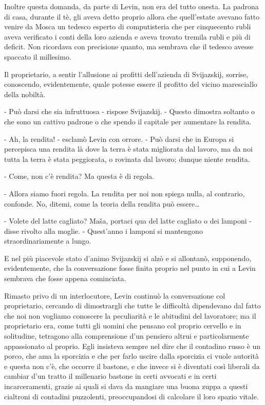 Inoltre questa domanda, da parte di Levin, non era del tutto onesta. La padrona di casa, durante il tè, gli aveva detto proprio allora che quell'estate avevano fatto venire da Mosca un tedesco esperto di computisteria che per cinquecento rubli aveva verificato i conti della loro azienda e aveva trovato tremila rubli e più di deficit. Non ricordava con precisione quanto, ma sembrava che il tedesco avesse spaccato il millesimo. 

Il proprietario, a sentir l'allusione ai profitti dell'azienda di Svijazskij, sorrise, conoscendo, evidentemente, quale potesse essere il profitto del vicino maresciallo della nobiltà. 

- Può darsi che sia infruttuosa - rispose Svijazskij. - Questo dimostra soltanto o che sono un cattivo padrone o che spendo il capitale per aumentare la rendita. 

- Ah, la rendita! - esclamò Levin con orrore. - Può darsi che in Europa si percepisca una rendita là dove la terra è stata migliorata dal lavoro, ma da noi tutta la terra è stata peggiorata, o rovinata dal lavoro; dunque niente rendita. 

- Come, non c'è rendita? Ma questa è di regola. 

- Allora siamo fuori regola. La rendita per noi non spiega nulla, al contrario, confonde. No, ditemi, come la teoria della rendita può essere\ldots{} 
\enlargethispage*{1\baselineskip}

- Volete del latte cagliato? Maša, portaci qua del latte cagliato o dei lamponi - disse rivolto alla moglie. - Quest'anno i lamponi si mantengono straordinariamente a lungo. 

E nel più piacevole stato d'animo Svijazskij si alzò e si allontanò, supponendo, evidentemente, che la conversazione fosse finita proprio nel punto in cui a Levin sembrava che fosse appena cominciata. 

Rimasto privo di un interlocutore, Levin continuò la conversazione col proprietario, cercando di dimostrargli che tutte le difficoltà dipendevano dal fatto che noi non vogliamo conoscere la peculiarità e le abitudini del lavoratore; ma il proprietario era, come tutti gli uomini che pensano col proprio cervello e in solitudine, tetragono alla comprensione d'un pensiero altrui e particolarmente appassionato al proprio. Egli insisteva sempre nel dire che il contadino russo è un porco, che ama la sporcizia e che per farlo uscire dalla sporcizia ci vuole autorità e questa non c'è, che occorre il bastone, e che invece si è diventati così liberali da cambiar d'un tratto il millenario bastone in certi avvocati e in certi incarceramenti, grazie ai quali si dava da mangiare una buona zuppa a questi cialtroni di contadini puzzolenti, preoccupandosi di calcolare il loro spazio vitale. 

